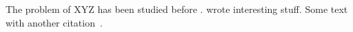 The problem  of XYZ has been studied before \cite{Lamport:Book:1989}.
\citet{Burkhardt:JNS:2019} wrote interesting stuff.
Some text with another citation~\cite{article-minimal}.
